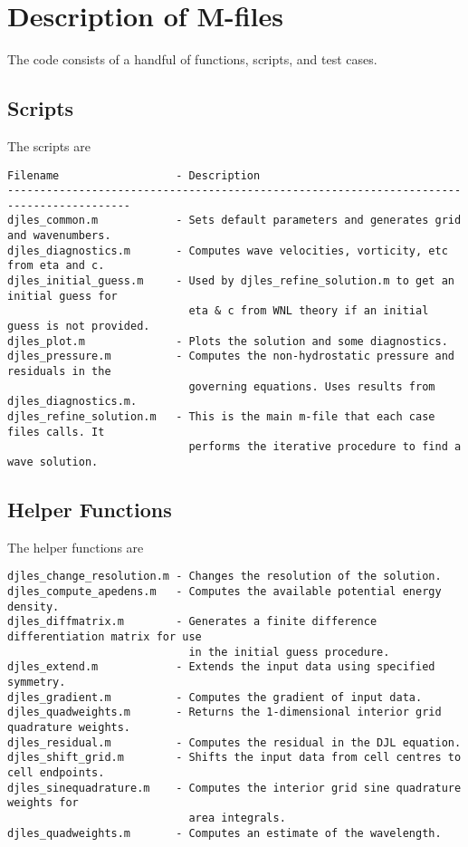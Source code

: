 \documentclass[letterpaper]{article}
\begin{document}
\section{Description of M-files}
The code consists of a handful of functions, scripts, and test cases.

\subsection{Scripts}
The scripts are
\begin{verbatim}
Filename                  - Description
-----------------------------------------------------------------------------------------
djles_common.m            - Sets default parameters and generates grid and wavenumbers.
djles_diagnostics.m       - Computes wave velocities, vorticity, etc from eta and c.
djles_initial_guess.m     - Used by djles_refine_solution.m to get an initial guess for
                            eta & c from WNL theory if an initial guess is not provided.
djles_plot.m              - Plots the solution and some diagnostics.
djles_pressure.m          - Computes the non-hydrostatic pressure and residuals in the
                            governing equations. Uses results from djles_diagnostics.m.
djles_refine_solution.m   - This is the main m-file that each case files calls. It
                            performs the iterative procedure to find a wave solution.
\end{verbatim}

\subsection{Helper Functions}
The helper functions are
\begin{verbatim}
djles_change_resolution.m - Changes the resolution of the solution.
djles_compute_apedens.m   - Computes the available potential energy density.
djles_diffmatrix.m        - Generates a finite difference differentiation matrix for use
                            in the initial guess procedure.
djles_extend.m            - Extends the input data using specified symmetry.
djles_gradient.m          - Computes the gradient of input data.
djles_quadweights.m       - Returns the 1-dimensional interior grid quadrature weights.
djles_residual.m          - Computes the residual in the DJL equation.
djles_shift_grid.m        - Shifts the input data from cell centres to cell endpoints.
djles_sinequadrature.m    - Computes the interior grid sine quadrature weights for
                            area integrals.
djles_quadweights.m       - Computes an estimate of the wavelength.
\end{verbatim}
\end{document}
